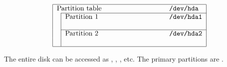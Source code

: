 $$
\begin{tabular}{|l|l|l|}
  \hline
  \multicolumn{3}{|l|}{Partition table\hbox to 2in{\hfil\tt /dev/hda~}} \\
  \cline{2-3}
  & \multicolumn{2}{l|}{Partition 1\hfill {\tt /dev/hda1}} \\
  & \multicolumn{2}{l|}{} \\
  \cline{2-3}
  & \multicolumn{2}{l|}{Partition 2\hfill {\tt /dev/hda2}} \\
  & \multicolumn{2}{l|}{} \\
  \hline
\end{tabular}
$$

The entire disk can be accessed as , ,
, etc. The primary partitions are .

